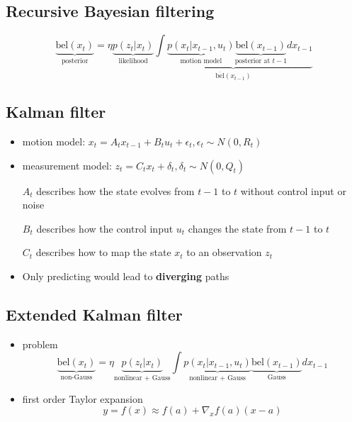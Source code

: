 \documentclass[12pt]{article}
\begin{document}
	\subsection{Recursive Bayesian filtering}
	\begin{equation}
		\underbrace{\text{bel}(x_t)}_{\text{posterior}} = \eta \underbrace{p(z_t|x_t)}_{\text{likelihood}} \underbrace{\int \underbrace{p(x_t|x_{t-1},u_t)}_{\text{motion model}} \underbrace{\text{bel}(x_{t-1})}_{\text{posterior at } t-1} dx_{t-1}}_{\overline{\text{bel}}(x_{t-1})}
	\end{equation}
	
	\subsection{Kalman filter}
	\begin{itemize}
		\item motion model: $x_t = A_tx_{t-1} + B_tu_t + \epsilon_t, \epsilon_t \sim N(0,R_t)$
		\item measurement model: $z_t = C_tx_t + \delta_t, \delta_t \sim N(0,Q_t)$
		\item[$A_t$] describes how the state evolves from $t-1$ to $t$ without control input or noise
		\item[$B_t$] describes how the control input $u_t$ changes the state from $t-1$ to $t$
		\item[$C_t$] describes how to map the state $x_t$ to an observation $z_t$
		\item Only predicting would lead to \textbf{diverging} paths
	\end{itemize}
	
	\subsection{Extended Kalman filter}
	\begin{itemize}
		\item problem
			\begin{equation}
				\underbrace{\text{bel}(x_t)}_{\text{non-Gauss}} = \eta \underbrace{p(z_t|x_t)}_{\text{nonlinear + Gauss}} \int \underbrace{p(x_t|x_{t-1},u_t)}_{\text{nonlinear + Gauss}} \underbrace{\text{bel}(x_{t-1})}_{\text{Gauss}} dx_{t-1}
			\end{equation}
		\item first order Taylor expansion
			\begin{equation}
				y = f(x) \approx f(a) + \nabla_x f(a) (x - a)
			\end{equation}
	\end{itemize}
\end{document}
